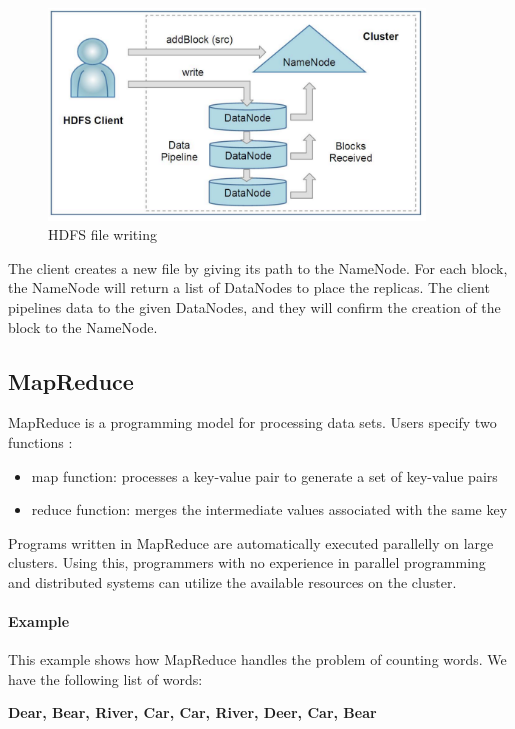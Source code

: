 \begin{figure}[H]
	\includegraphics[width=100mm, keepaspectratio]{figures/hdfs_client.png}
	\centering
	\caption*{HDFS file writing}
\end{figure}
The client creates a new file by giving its path to the NameNode. For each block, the NameNode will return a list of DataNodes to place the replicas. The client pipelines data to the given DataNodes, and they will confirm the creation of the block to the NameNode.
\clearpage
\subsection{MapReduce}
MapReduce is a programming model for processing data sets. Users specify two functions \cite{Dean:2004:MSD:1251254.1251264}:
\begin{itemize}
	\item map function: processes a key-value pair to generate a set of key-value pairs
	\item reduce function: merges the intermediate values associated with the same key
\end{itemize}

Programs written in MapReduce are automatically executed parallelly on large clusters. Using this, programmers with no experience in parallel programming and distributed systems can utilize the available resources on the cluster.
\paragraph{Example \cite{MapReduce-example}}
This example shows how MapReduce handles the problem of counting words. We have the following list of words: 
\begin{center}
	\textbf{Dear, Bear, River, Car, Car, River, Deer, Car, Bear}
\end{center}

